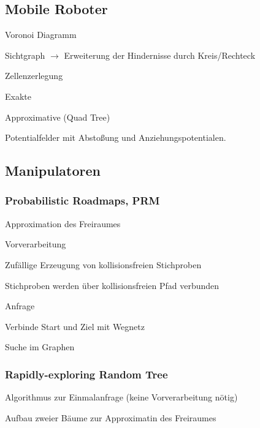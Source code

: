 \subsection{Mobile Roboter}
\begin{compactitem}
    \item Voronoi Diagramm
    \item Sichtgraph $\rightarrow$ Erweiterung der Hindernisse durch Kreis/Rechteck
    \item Zellenzerlegung
    \begin{compactitem}
        \item Exakte
        \item Approximative (Quad Tree)
    \end{compactitem}
    \item Potentialfelder mit Abstoßung und Anziehungspotentialen.
\end{compactitem}
\subsection{Manipulatoren}
\subsubsection{Probabilistic Roadmaps, PRM}
\begin{compactitem}
    \item Approximation des Freiraumes
\end{compactitem}
\begin{compactenum}
    \item Vorverarbeitung
    \begin{compactitem}
        \item Zufällige Erzeugung von kollisionsfreien Stichproben
        \item Stichproben werden über kollisionsfreien Pfad verbunden
    \end{compactitem}
    \item Anfrage
    \begin{compactitem}
        \item Verbinde Start und Ziel mit Wegnetz
        \item Suche im Graphen
    \end{compactitem}
\end{compactenum}

\subsubsection{Rapidly-exploring Random Tree}
\begin{compactitem}
    \item Algorithmus zur Einmalanfrage (keine Vorverarbeitung nötig)
    \item Aufbau zweier Bäume zur Approximatin des Freiraumes
\end{compactitem}


